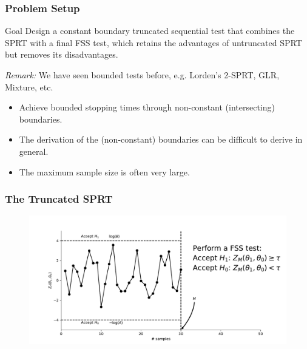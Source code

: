 \documentclass[10pt]{beamer}
\begin{document}
\begin{frame}
\frametitle{Problem Setup}

\begin{block}{Goal}
Design a constant boundary truncated sequential test that combines the SPRT with a final FSS test, which retains the advantages of untruncated SPRT but removes its disadvantages.
\end{block}

\textit{Remark:} We have seen bounded tests before, e.g. Lorden's 2-SPRT, GLR, Mixture, etc.
\begin{itemize}
\item Achieve bounded stopping times through non-constant (intersecting) boundaries.
\item The derivation of the (non-constant) boundaries can be difficult to derive in general.
\item The maximum sample size is often very large.
\end{itemize}

\end{frame}

\begin{frame}
\frametitle{The Truncated SPRT}

\begin{figure}
\centering
\includegraphics[width=\textwidth]{images/truncated_sprt}
\end{figure}

\citet{tantara1977, tantara1982}
\end{frame}
\end{document}
